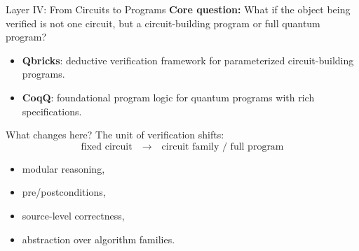 \documentclass[aspectratio=169]{beamer}
\begin{document}
\begin{frame}{Layer IV: From Circuits to Programs}
\justifying
\textbf{Core question:} What if the object being verified is not one circuit, but a circuit-building program or full quantum program?

\vspace{0.5em}
\begin{itemize}
    \item \textbf{Qbricks}: deductive verification framework for parameterized circuit-building programs.
    \item \textbf{CoqQ}: foundational program logic for quantum programs with rich specifications.
\end{itemize}

\pause

\begin{block}{What changes here?}
The unit of verification shifts:
\[
\text{fixed circuit} \quad \longrightarrow \quad \text{circuit family / full program}
\]
\end{block}

\pause

\begin{itemize}
    \item modular reasoning,
    \item pre/postconditions,
    \item source-level correctness,
    \item abstraction over algorithm families.
\end{itemize}
\end{frame}
\end{document}
